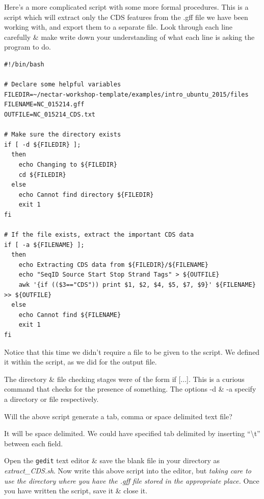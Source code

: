 \documentclass[a4paper,12pt,twoside]{memoir}
\begin{document}
Here's a more complicated script with some more formal procedures.
This is a script which will extract only the CDS features from the .gff file we have been working with, and export them to a separate file.
Look through each line carefully \& make write down your understanding of what each line is asking the program to do.

\begin{lstlisting}
#!/bin/bash

# Declare some helpful variables
FILEDIR=~/nectar-workshop-template/examples/intro_ubuntu_2015/files
FILENAME=NC_015214.gff
OUTFILE=NC_015214_CDS.txt

# Make sure the directory exists
if [ -d ${FILEDIR} ];
  then
    echo Changing to ${FILEDIR}
    cd ${FILEDIR}
  else
    echo Cannot find directory ${FILEDIR}
    exit 1
fi

# If the file exists, extract the important CDS data
if [ -a ${FILENAME} ];
  then
    echo Extracting CDS data from ${FILEDIR}/${FILENAME}
    echo "SeqID Source Start Stop Strand Tags" > ${OUTFILE}
    awk '{if (($3=="CDS")) print $1, $2, $4, $5, $7, $9}' ${FILENAME} >> ${OUTFILE}
  else
    echo Cannot find ${FILENAME}
    exit 1
fi
\end{lstlisting}

Notice that this time we didn't require a file to be given to the script.
We defined it within the script, as we did for the output file.

\begin{information}
The directory \& file checking stages were of the form if [...].
This is a curious command that checks for the presence of something. 
The options -d \& -a specify a directory or file respectively.
\end{information}

\begin{questions}
Will the above script generate a tab, comma or space delimited text file? \\
\begin{answer}
It will be space delimited. 
We could have specified tab delimited by inserting ``\textbackslash t'' between each field.
\end{answer}
\end{questions}

\begin{steps}
Open the \texttt{gedit} text editor \& save the blank file in your directory as \textit{extract_CDS.sh}.
Now write this above script into the editor, but \textit{taking care to use the directory where you have the .gff file stored in the appropriate place.}
Once you have written the script, save it \& close it.\\
\end{steps}
\end{document}
